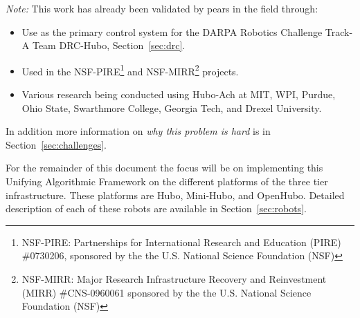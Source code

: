 \noindent \textit{Note:} This work has already been validated by pears in the field through:
\begin{itemize}
\item Use as the primary control system for the DARPA Robotics Challenge Track-A Team DRC-Hubo, Section~\ref{sec:drc}.
\item Used in the NSF-PIRE\footnote{NSF-PIRE: Partnerships for International Research
and Education (PIRE) \#0730206, sponsored by the the U.S. National
Science Foundation (NSF)} and NSF-MIRR\footnote{NSF-MIRR: Major Research Infrastructure Recovery and Reinvestment (MIRR) \#CNS-0960061 sponsored by the the U.S. National Science Foundation (NSF)} projects.
\item Various research being conducted using Hubo-Ach at MIT, WPI, Purdue, Ohio State, Swarthmore College, Georgia Tech, and Drexel University.
\end{itemize}
\noindent In addition more information on \textit{why this problem is hard} is in Section~\ref{sec:challenges}.

For the remainder of this document the focus will be on implementing this Unifying Algorithmic Framework on the different platforms of the three tier infrastructure.
These platforms are Hubo, Mini-Hubo, and OpenHubo.  
Detailed description of each of these robots are available in Section~\ref{sec:robots}.





